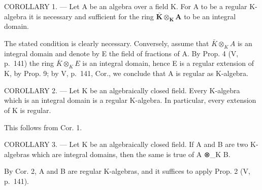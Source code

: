 COROLLARY 1. --- Let A be an algebra over a field K. For A to be a regular K-algebra it is necessary and sufficient for the ring \(\bar{\mathbf{K}}\otimes_{\mathbf{K}}\mathbf{A}\) to be an integral domain.

The stated condition is clearly necessary. Conversely, assume that \(\bar{K} \otimes_{K} A\) is an integral domain and denote by E the field of fractions of A. By Prop. 4 (V, p.~141) the ring \(\bar{K} \otimes_{K} E\) is an integral domain, hence E is a regular extension of K, by Prop. 9; by V, p.~141, Cor., we conclude that A is regular as K-algebra.

COROLLARY 2. --- Let K be an algebraically closed field. Every K-algebra which is an integral domain is a regular K-algebra. In particular, every extension of K is regular.

This follows from Cor. 1.

COROLLARY 3. --- Let K be an algebraically closed field. If A and B are two K-algebras which are integral domains, then the same is true of A ⊗\_K B.

By Cor. 2, A and B are regular K-algebras, and it suffices to apply Prop. 2 (V, p.~141).


